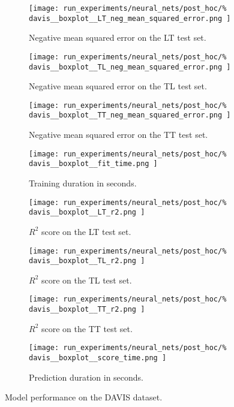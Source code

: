\begin{figure*}
    \centering
    \begin{subfigure}{0.24\textwidth}
        \texttt{[image: 
            run\_experiments/neural\_nets/post\_hoc/\%
            davis\_\_boxplot\_\_LT\_neg\_mean\_squared\_error.png
        ]}
        \caption{Negative mean squared error on the LT test set.}
    \end{subfigure}
    \begin{subfigure}{0.24\textwidth}
        \texttt{[image: 
            run\_experiments/neural\_nets/post\_hoc/\%
            davis\_\_boxplot\_\_TL\_neg\_mean\_squared\_error.png
        ]}
        \caption{Negative mean squared error on the TL test set.}
    \end{subfigure}
    \begin{subfigure}{0.24\textwidth}
        \texttt{[image: 
            run\_experiments/neural\_nets/post\_hoc/\%
            davis\_\_boxplot\_\_TT\_neg\_mean\_squared\_error.png
        ]}
        \caption{Negative mean squared error on the TT test set.}
    \end{subfigure}
    \begin{subfigure}{0.24\textwidth}
        \texttt{[image: 
            run\_experiments/neural\_nets/post\_hoc/\%
            davis\_\_boxplot\_\_fit\_time.png
        ]}
        \caption{Training duration in seconds.}
    \end{subfigure}

    \begin{subfigure}{0.24\textwidth}
        \texttt{[image: 
            run\_experiments/neural\_nets/post\_hoc/\%
            davis\_\_boxplot\_\_LT\_r2.png
        ]}
        \caption{$R^2$ score on the LT test set.}
    \end{subfigure}
    \begin{subfigure}{0.24\textwidth}
        \texttt{[image: 
            run\_experiments/neural\_nets/post\_hoc/\%
            davis\_\_boxplot\_\_TL\_r2.png
        ]}
        \caption{$R^2$ score on the TL test set.}
    \end{subfigure}
    \begin{subfigure}{0.24\textwidth}
        \texttt{[image: 
            run\_experiments/neural\_nets/post\_hoc/\%
            davis\_\_boxplot\_\_TT\_r2.png
        ]}
        \caption{$R^2$ score on the TT test set.}
    \end{subfigure}
    \begin{subfigure}{0.24\textwidth}
        \texttt{[image: 
            run\_experiments/neural\_nets/post\_hoc/\%
            davis\_\_boxplot\_\_score\_time.png
        ]}
        \caption{Prediction duration in seconds.}
    \end{subfigure}

    \caption{Model performance on the DAVIS dataset.}
    \label{fig:davis_mse}
\end{figure*}


